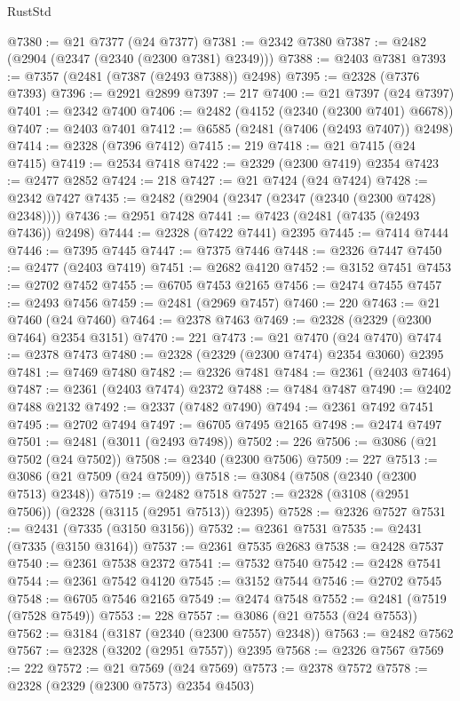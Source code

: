 \begin{lexlean}{RustStd}
\begin{coremodule}
@7380 := @21 @7377 (@24 @7377)
@7381 := @2342 @7380
@7387 := @2482 (@2904 (@2347 (@2340 (@2300 @7381) @2349)))
@7388 := @2403 @7381
@7393 := @7357 (@2481 (@7387 (@2493 @7388)) @2498)
@7395 := @2328 (@7376 @7393)
@7396 := @2921 @2899
@7397 := 217
@7400 := @21 @7397 (@24 @7397)
@7401 := @2342 @7400
@7406 := @2482 (@4152 (@2340 (@2300 @7401) @6678))
@7407 := @2403 @7401
@7412 := @6585 (@2481 (@7406 (@2493 @7407)) @2498)
@7414 := @2328 (@7396 @7412)
@7415 := 219
@7418 := @21 @7415 (@24 @7415)
@7419 := @2534 @7418
@7422 := @2329 (@2300 @7419) @2354
@7423 := @2477 @2852
@7424 := 218
@7427 := @21 @7424 (@24 @7424)
@7428 := @2342 @7427
@7435 := @2482 (@2904 (@2347 (@2347 (@2340 (@2300 @7428) @2348))))
@7436 := @2951 @7428
@7441 := @7423 (@2481 (@7435 (@2493 @7436)) @2498)
@7444 := @2328 (@7422 @7441) @2395
@7445 := @7414 @7444
@7446 := @7395 @7445
@7447 := @7375 @7446
@7448 := @2326 @7447
@7450 := @2477 (@2403 @7419)
@7451 := @2682 @4120
@7452 := @3152 @7451
@7453 := @2702 @7452
@7455 := @6705 @7453 @2165
@7456 := @2474 @7455
@7457 := @2493 @7456
@7459 := @2481 (@2969 @7457)
@7460 := 220
@7463 := @21 @7460 (@24 @7460)
@7464 := @2378 @7463
@7469 := @2328 (@2329 (@2300 @7464) @2354 @3151)
@7470 := 221
@7473 := @21 @7470 (@24 @7470)
@7474 := @2378 @7473
@7480 := @2328 (@2329 (@2300 @7474) @2354 @3060) @2395
@7481 := @7469 @7480
@7482 := @2326 @7481
@7484 := @2361 (@2403 @7464)
@7487 := @2361 (@2403 @7474) @2372
@7488 := @7484 @7487
@7490 := @2402 @7488 @2132
@7492 := @2337 (@7482 @7490)
@7494 := @2361 @7492 @7451
@7495 := @2702 @7494
@7497 := @6705 @7495 @2165
@7498 := @2474 @7497
@7501 := @2481 (@3011 (@2493 @7498))
@7502 := 226
@7506 := @3086 (@21 @7502 (@24 @7502))
@7508 := @2340 (@2300 @7506)
@7509 := 227
@7513 := @3086 (@21 @7509 (@24 @7509))
@7518 := @3084 (@7508 (@2340 (@2300 @7513) @2348))
@7519 := @2482 @7518
@7527 := @2328 (@3108 (@2951 @7506)) (@2328 (@3115 (@2951 @7513)) @2395)
@7528 := @2326 @7527
@7531 := @2431 (@7335 (@3150 @3156))
@7532 := @2361 @7531
@7535 := @2431 (@7335 (@3150 @3164))
@7537 := @2361 @7535 @2683
@7538 := @2428 @7537
@7540 := @2361 @7538 @2372
@7541 := @7532 @7540
@7542 := @2428 @7541
@7544 := @2361 @7542 @4120
@7545 := @3152 @7544
@7546 := @2702 @7545
@7548 := @6705 @7546 @2165
@7549 := @2474 @7548
@7552 := @2481 (@7519 (@7528 @7549))
@7553 := 228
@7557 := @3086 (@21 @7553 (@24 @7553))
@7562 := @3184 (@3187 (@2340 (@2300 @7557) @2348))
@7563 := @2482 @7562
@7567 := @2328 (@3202 (@2951 @7557)) @2395
@7568 := @2326 @7567
@7569 := 222
@7572 := @21 @7569 (@24 @7569)
@7573 := @2378 @7572
@7578 := @2328 (@2329 (@2300 @7573) @2354 @4503)

\end{coremodule}
\end{lexlean}
